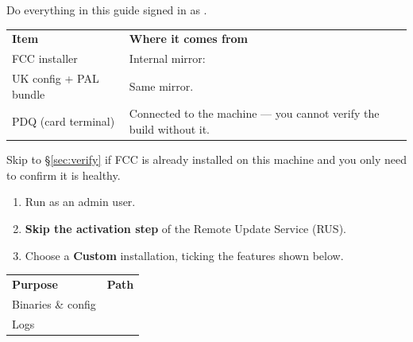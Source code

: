 \documentclass[a4paper,10pt]{article}
\begin{document}
\tableofcontents
\clearpage


Do everything in this guide signed in as .

\begin{center}
\renewcommand{\arraystretch}{1.35}\small
\begin{tabularx}{\textwidth}{L{44mm} X}
\color{white}\textbf{Item} &
\color{white}\textbf{Where it comes from}\\
FCC installer &
Internal mirror: \\
UK config + PAL bundle &
Same mirror.\\
PDQ (card terminal) &
Connected to the machine --- you cannot verify the build without it.\\
\end{tabularx}
\end{center}


Skip to \S\ref{sec:verify} if FCC is already installed on this machine and
you only need to confirm it is healthy.

\begin{enumerate}
  \item Run  as an admin user.

  \item \textbf{Skip the activation step} of the Remote Update Service
        (RUS).

  \item Choose a \textbf{Custom} installation, ticking the features shown
        below.
\end{enumerate}


\begin{center}
\renewcommand{\arraystretch}{1.3}\small
\begin{tabularx}{\textwidth}{L{30mm} X}
\color{white}\textbf{Purpose} &
\color{white}\textbf{Path}\\
Binaries \& config &
\\
Logs &
\\
\end{tabularx}
\end{center}
\end{document}
